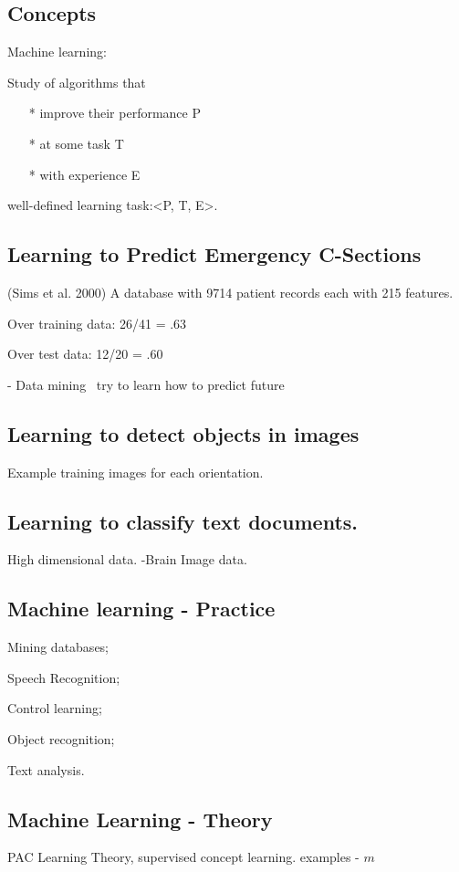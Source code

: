 \documentclass[twoside]{article}
\begin{document}
\subsection{Concepts}
Machine learning:
	
Study of algorithms that 
\begin{enumerate}
\item[*] improve their performance P
\item[*] at some task T
\item[*] with experience E
\end{enumerate}
well-defined learning task:<P, T, E>.

\subsection{Learning to Predict Emergency C-Sections}
(Sims et al. 2000) A database with 9714 patient records each with 215 features.

Over training data: 26/41 = .63

Over test data: 12/20 = .60

- Data mining~ try to learn how to predict future~

\subsection{Learning to detect objects in images}
Example training images for each orientation.

\subsection{Learning to classify text documents.}
High dimensional data.
-Brain Image data.

\subsection{Machine learning - Practice}
Mining databases;

Speech Recognition; 

Control learning;

Object recognition;

Text analysis.

\subsection{Machine Learning - Theory}
PAC Learning Theory, supervised concept learning.
examples - $m$
\end{document}
